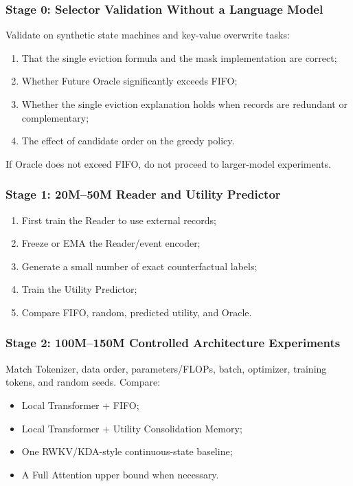 \subsubsection{Stage 0: Selector Validation Without a Language Model}

Validate on synthetic state machines and key-value overwrite tasks:

\begin{enumerate}
  \item That the single eviction formula and the mask implementation are correct;
  \item Whether Future Oracle significantly exceeds FIFO;
  \item Whether the single eviction explanation holds when records are redundant or complementary;
  \item The effect of candidate order on the greedy policy.
\end{enumerate}

If Oracle does not exceed FIFO, do not proceed to larger-model experiments.

\subsubsection{Stage 1: 20M--50M Reader and Utility Predictor}

\begin{enumerate}
  \item First train the Reader to use external records;
  \item Freeze or EMA the Reader/event encoder;
  \item Generate a small number of exact counterfactual labels;
  \item Train the Utility Predictor;
  \item Compare FIFO, random, predicted utility, and Oracle.
\end{enumerate}

\subsubsection{Stage 2: 100M--150M Controlled Architecture Experiments}

Match Tokenizer, data order, parameters/FLOPs, batch, optimizer, training tokens, and random seeds. Compare:

\begin{itemize}
  \item Local Transformer + FIFO;
  \item Local Transformer + Utility Consolidation Memory;
  \item One RWKV/KDA-style continuous-state baseline;
  \item A Full Attention upper bound when necessary.
\end{itemize}

